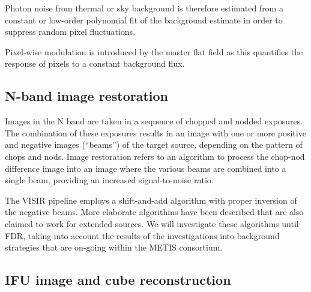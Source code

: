 Photon noise from thermal or sky background is therefore estimated
from a constant or low-order polynomial fit of the background estimate
in order to suppress random pixel fluctuations.

Pixel-wise modulation is introduced by the master flat field as this
quantifies the response of pixels to a constant background flux.

\subsection{N-band image restoration}\label{ssec:criticalnbandimagerestoration}
\label{ssec:image_restoration}


Images in the N band are taken in a sequence of chopped and nodded
exposures. The combination of these exposures results in an image with
one or more positive and negative images (``beams'') of the target
source, depending on the pattern of chops and nods. Image restoration
refers to an algorithm to process the chop-nod difference image into
an image where the various beams are combined into a single beam,
providing an increased signal-to-noise ratio.

The VISIR pipeline employs a shift-and-add algorithm with proper
inversion of the negative beams. More elaborate algorithms have been
described that are also claimed to work for extended sources. We will
investigate these algorithms until FDR, taking into account the
results of the investigations into background strategies that are
on-going within the METIS consortium.


\subsection{IFU image and cube reconstruction}\label{ssec:criticalifuimageandcubereconstruction}
\label{ssec:image_reconstruction}

